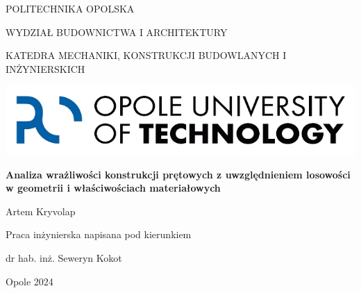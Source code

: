 \begin{titlepage}
    \centering

    {\scshape
    POLITECHNIKA OPOLSKA\par
    WYDZIAŁ BUDOWNICTWA I ARCHITEKTURY\par
    KATEDRA MECHANIKI, KONSTRUKCJI BUDOWLANYCH I INŻYNIERSKICH\par\vspace{2cm}
    }

    \includegraphics[scale=0.4]{images/logo}\par\vspace{2cm}


    {\Large\bfseries
    Analiza wrażliwości konstrukcji prętowych z uwzględnieniem losowości
    w geometrii i właściwościach materiałowych\par\vspace{2cm}
    }

    {\Large Artem Kryvolap \par\vspace{3cm}}

    {\large
    Praca inżynierska napisana pod kierunkiem\par
    dr hab. inż. Seweryn Kokot\par\vspace{3.5cm}
    }

    {\large Opole 2024\par}

    \vfill
\end{titlepage}
